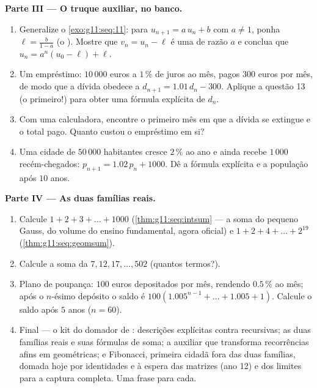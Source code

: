 \begin{problem}
\medskip
\noindent\textbf{Parte III --- O truque auxiliar, no banco.}
\begin{enumerate}[resume]
  \item Generalize o \cref{exo:g11:seq:11}: para
        $u_{n+1} = a\,u_n + b$ com $a \neq 1$, ponha
        $\ell = \frac{b}{1 - a}$ (o ). Mostre que
        $v_n = u_n - \ell$ é uma  de razão
        $a$ e conclua que $u_n = a^n (u_0 - \ell) + \ell$.
  \item Um empréstimo: $10\,000$ euros a $1\,\%$ de juros ao mês,
        pagos $300$ euros por mês, de modo que a dívida obedece a
        $d_{n+1} = 1.01\,d_n - 300$. Aplique a questão 13 (o
         primeiro!) para obter uma fórmula explícita
        de $d_n$.
  \item Com uma calculadora, encontre o primeiro mês em que a
        dívida se extingue e o total pago. Quanto custou o
        empréstimo em si?
  \item Uma cidade de $50\,000$ habitantes cresce $2\,\%$ ao ano
        e ainda recebe $1\,000$ recém-chegados:
        $p_{n+1} = 1.02\,p_n + 1000$. Dê a fórmula explícita e a
        população após $10$ anos.
\end{enumerate}

\medskip
\noindent\textbf{Parte IV --- As duas famílias reais.}
\begin{enumerate}[resume]
  \item Calcule $1 + 2 + 3 + \dots + 1000$
        (\cref{thm:g11:seq:intsum} --- a soma do pequeno Gauss,
        do volume do ensino fundamental, agora oficial) e
        $1 + 2 + 4 + \dots + 2^{19}$
        (\cref{thm:g11:seq:geomsum}).
  \item Calcule a soma da 
        $7, 12, 17, \dots, 502$ (quantos termos?).
  \item Plano de poupança: $100$ euros depositados por mês,
        rendendo $0.5\,\%$ ao mês; após o $n$-ésimo depósito o
        saldo é $100\left(1.005^{n-1} + \dots + 1.005 +
        1\right)$. Calcule o saldo após $5$ anos ($n = 60$).
  \item Final --- o kit do domador de : descrições
        explícitas contra recursivas; as duas famílias reais e
        suas fórmulas de soma; a  auxiliar que
        transforma recorrências afins em geométricas; e
        Fibonacci, primeira cidadã fora das duas famílias,
        domada hoje por identidades e à espera das matrizes (ano
        12) e dos limites para a captura completa. Uma frase para
        cada.
\end{enumerate}
\end{problem}
